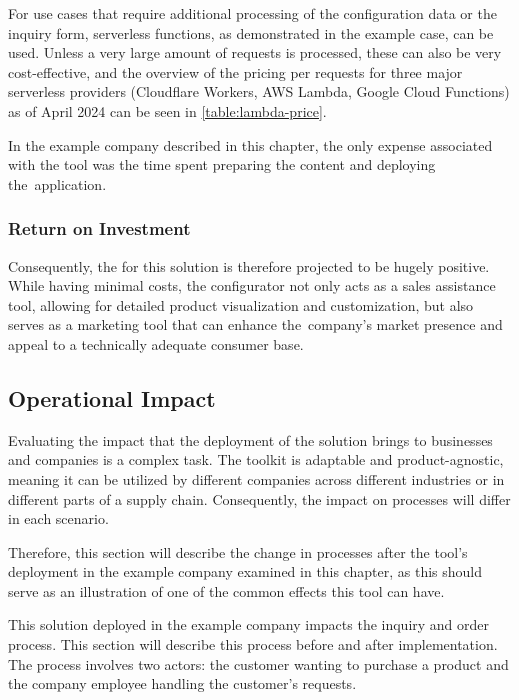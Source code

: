 For use cases that require additional processing of the configuration data or the inquiry form, serverless functions, as demonstrated in the example case, can be used. Unless a very large amount of requests is processed, these can also be very cost-effective, and the overview of the pricing per requests for three major serverless providers (Cloudflare Workers, AWS Lambda, Google Cloud Functions) as of April 2024 can be seen in \autoref{table:lambda-price}.


In the example company described in this chapter, the only expense associated with the tool was the time spent preparing the content and deploying the~application.


\subsubsection{Return on Investment}

Consequently, the  for this solution is therefore projected to be hugely positive. While having minimal costs, the configurator not only acts as a sales assistance tool, allowing for detailed product visualization and customization, but also serves as a marketing tool that can enhance the~company's market presence and appeal to a technically adequate consumer base. 


\subsection{Operational Impact}

Evaluating the impact that the deployment of the solution brings to businesses and companies is a complex task. The toolkit is adaptable and product-agnostic, meaning it can be utilized by different companies across different industries or in different parts of a supply chain. Consequently, the impact on processes will differ in each scenario.

Therefore, this section will describe the change in processes after the tool's deployment in the example company examined in this chapter, as this should serve as an illustration of one of the common effects this tool can have.

This solution deployed in the example company impacts the inquiry and order process. This section will describe this process before and after implementation. The process involves two actors: the customer wanting to purchase a product and the company employee handling the customer's requests.

